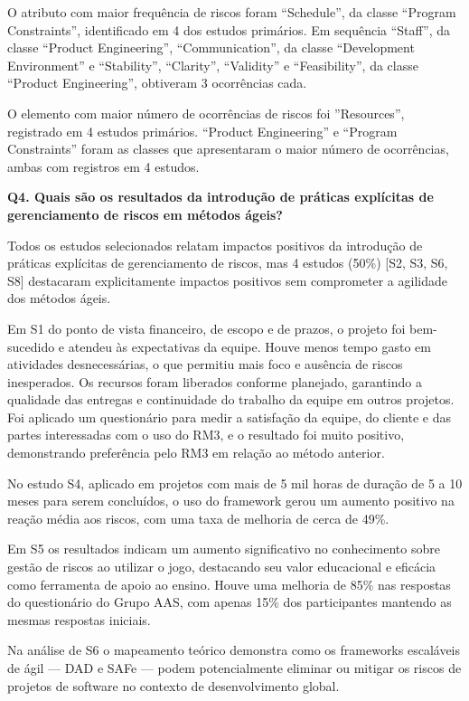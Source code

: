 \documentclass[
	12pt,
	openright,
	twoside,
	a4paper,
	english,
	brazil
	]{abntex2}
\begin{document}
O atributo com maior frequência de riscos foram “Schedule”, da classe “Program Constraints”, identificado em 4 dos estudos primários. Em sequência “Staff”, da classe “Product Engineering”, “Communication”, da classe “Development Environment” e “Stability”,  “Clarity”, “Validity” e  “Feasibility”, da classe “Product Engineering”, obtiveram 3 ocorrências cada.

O elemento com maior número de ocorrências de riscos foi ”Resources”, registrado em 4 estudos primários. “Product Engineering” e “Program Constraints” foram as  classes que apresentaram o maior número de ocorrências, ambas com registros em 4 estudos.

\textbf{Q4. Quais são os resultados da introdução de práticas explícitas de gerenciamento de riscos em métodos ágeis?}

Todos os estudos selecionados relatam impactos positivos da introdução de práticas explícitas de gerenciamento de riscos, mas 4 estudos (50\%) [S2, S3, S6, S8] destacaram explicitamente impactos positivos sem comprometer a agilidade dos métodos ágeis.

Em S1 do ponto de vista financeiro, de escopo e de prazos, o projeto foi bem-sucedido e atendeu às expectativas da equipe. Houve menos tempo gasto em atividades desnecessárias, o que permitiu mais foco e ausência de riscos inesperados. Os recursos foram liberados conforme planejado, garantindo a qualidade das entregas e continuidade do trabalho da equipe em outros projetos. Foi aplicado um questionário para medir a satisfação da equipe, do cliente e das partes interessadas com o uso do RM3, e o resultado foi muito positivo,  demonstrando preferência pelo RM3 em relação ao método anterior.

No estudo S4, aplicado em projetos com mais de 5 mil horas de duração de 5 a 10 meses para serem concluídos, o uso do framework gerou um aumento positivo na reação média aos riscos, com uma taxa de melhoria de cerca de 49\%.

Em S5 os resultados indicam um aumento significativo no conhecimento sobre gestão de riscos ao utilizar o jogo, destacando seu valor educacional e eficácia como ferramenta de apoio ao ensino. Houve uma melhoria de 85\% nas respostas do questionário do Grupo AAS, com apenas 15\% dos participantes mantendo as mesmas respostas iniciais.

Na análise de S6 o mapeamento teórico demonstra como os frameworks escaláveis de ágil — DAD e SAFe — podem potencialmente eliminar ou mitigar os riscos de projetos de software no contexto de desenvolvimento global.
\end{document}
